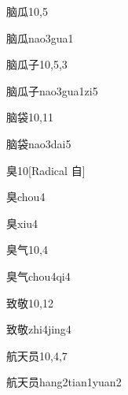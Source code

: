 \begin{entry}{脑瓜}{10,5}
  \begin{phonetics}{脑瓜}{nao3gua1}
  \end{phonetics}
\end{entry}

\begin{entry}{脑瓜子}{10,5,3}
  \begin{phonetics}{脑瓜子}{nao3gua1zi5}
  \end{phonetics}
\end{entry}

\begin{entry}{脑袋}{10,11}
  \begin{phonetics}{脑袋}{nao3dai5}
  \end{phonetics}
\end{entry}

\begin{entry}{臭}{10}[Radical ⾃]
  \begin{phonetics}{臭}{chou4}
  \end{phonetics}
  \begin{phonetics}{臭}{xiu4}
  \end{phonetics}
\end{entry}

\begin{entry}{臭气}{10,4}
  \begin{phonetics}{臭气}{chou4qi4}
  \end{phonetics}
\end{entry}

\begin{entry}{致敬}{10,12}
  \begin{phonetics}{致敬}{zhi4jing4}
  \end{phonetics}
\end{entry}

\begin{entry}{航天员}{10,4,7}
  \begin{phonetics}{航天员}{hang2tian1yuan2}
  \end{phonetics}
\end{entry}

